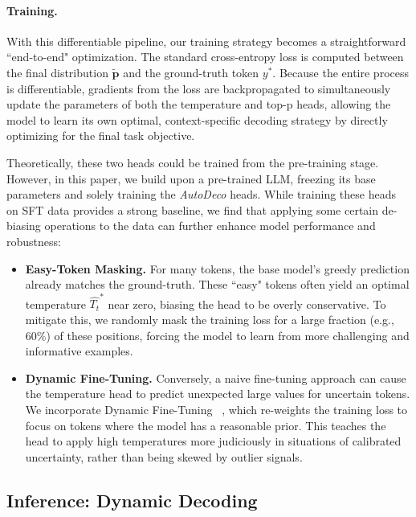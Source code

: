 \paragraph{Training.}
With this differentiable pipeline, our training strategy becomes a straightforward ``end-to-end" optimization. The standard cross-entropy loss is computed between the final distribution $\tilde{\mathbf{p}}$ and the ground-truth token $y^*$. Because the entire process is differentiable, gradients from the loss are backpropagated to simultaneously update the parameters of both the temperature and top-p heads, allowing the model to learn its own optimal, context-specific decoding strategy by directly optimizing for the final task objective.


Theoretically, these two heads could be trained from the pre-training stage. However, in this paper, we build upon a pre-trained LLM, freezing its base parameters and solely training the \textit{AutoDeco} heads. While training these heads on SFT data provides a strong baseline, we find that applying some certain de-biasing operations to the data can further enhance model performance and robustness:

\begin{itemize}[leftmargin=2em, ]
    \item \textbf{Easy-Token Masking.} For many tokens, the base model's greedy prediction already matches the ground-truth. These ``easy" tokens often yield an optimal temperature $\hat{T_t}^*$ near zero, biasing the head to be overly conservative. To mitigate this, we randomly mask the training loss for a large fraction (e.g., 60\%) of these positions, forcing the model to learn from more challenging and informative examples.

    \item \textbf{Dynamic Fine-Tuning.} Conversely, a naive fine-tuning approach can cause the temperature head to predict unexpected large values for uncertain tokens. We incorporate Dynamic Fine-Tuning ~\citep{wu2025generalizationsftreinforcementlearning}, which re-weights the training loss to focus on tokens where the model has a reasonable prior. This teaches the head to apply high temperatures more judiciously in situations of calibrated uncertainty, rather than being skewed by outlier signals.
\end{itemize}



\subsection{Inference: Dynamic Decoding}
\label{sec:inference_pipeline}

